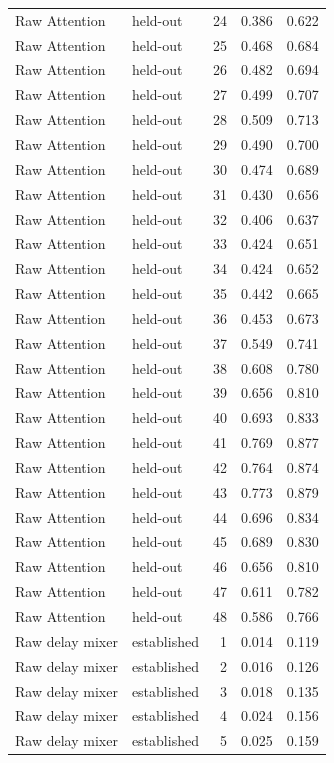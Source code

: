 \begin{tabular}{llrrr}
Raw Attention & held-out & 24 & 0.386 & 0.622 \\
Raw Attention & held-out & 25 & 0.468 & 0.684 \\
Raw Attention & held-out & 26 & 0.482 & 0.694 \\
Raw Attention & held-out & 27 & 0.499 & 0.707 \\
Raw Attention & held-out & 28 & 0.509 & 0.713 \\
Raw Attention & held-out & 29 & 0.490 & 0.700 \\
Raw Attention & held-out & 30 & 0.474 & 0.689 \\
Raw Attention & held-out & 31 & 0.430 & 0.656 \\
Raw Attention & held-out & 32 & 0.406 & 0.637 \\
Raw Attention & held-out & 33 & 0.424 & 0.651 \\
Raw Attention & held-out & 34 & 0.424 & 0.652 \\
Raw Attention & held-out & 35 & 0.442 & 0.665 \\
Raw Attention & held-out & 36 & 0.453 & 0.673 \\
Raw Attention & held-out & 37 & 0.549 & 0.741 \\
Raw Attention & held-out & 38 & 0.608 & 0.780 \\
Raw Attention & held-out & 39 & 0.656 & 0.810 \\
Raw Attention & held-out & 40 & 0.693 & 0.833 \\
Raw Attention & held-out & 41 & 0.769 & 0.877 \\
Raw Attention & held-out & 42 & 0.764 & 0.874 \\
Raw Attention & held-out & 43 & 0.773 & 0.879 \\
Raw Attention & held-out & 44 & 0.696 & 0.834 \\
Raw Attention & held-out & 45 & 0.689 & 0.830 \\
Raw Attention & held-out & 46 & 0.656 & 0.810 \\
Raw Attention & held-out & 47 & 0.611 & 0.782 \\
Raw Attention & held-out & 48 & 0.586 & 0.766 \\
Raw delay mixer & established & 1 & 0.014 & 0.119 \\
Raw delay mixer & established & 2 & 0.016 & 0.126 \\
Raw delay mixer & established & 3 & 0.018 & 0.135 \\
Raw delay mixer & established & 4 & 0.024 & 0.156 \\
Raw delay mixer & established & 5 & 0.025 & 0.159 \\

\end{tabular}
